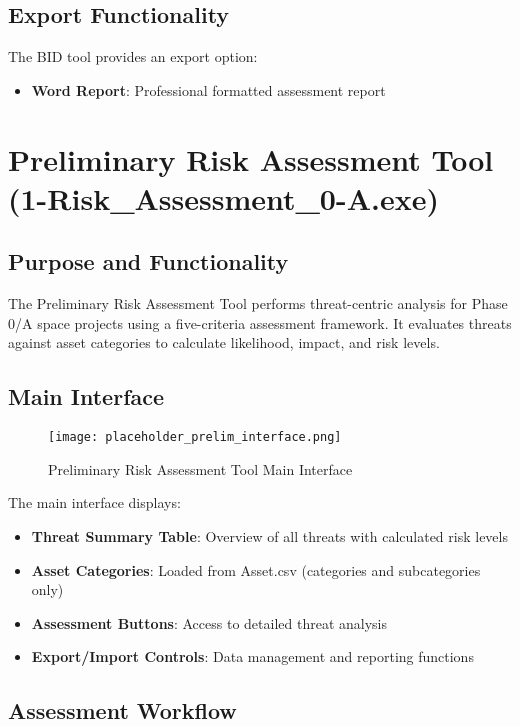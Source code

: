 \documentclass[binding=0.6cm]{sapthesis}
\begin{document}
\subsection{Export Functionality}

The BID tool provides an export option:
\begin{itemize}
    \item \textbf{Word Report}: Professional formatted assessment report
\end{itemize}

\section{Preliminary Risk Assessment Tool (1-Risk\_Assessment\_0-A.exe)}

\subsection{Purpose and Functionality}

The Preliminary Risk Assessment Tool performs threat-centric analysis for Phase 0/A space projects using a five-criteria assessment framework. It evaluates threats against asset categories to calculate likelihood, impact, and risk levels.

\subsection{Main Interface}

\begin{figure}[H]
    \centering
    \texttt{[image: placeholder\_prelim\_interface.png]}
    \caption{Preliminary Risk Assessment Tool Main Interface}
    \label{fig:prelim_interface}
\end{figure}

The main interface displays:
\begin{itemize}
    \item \textbf{Threat Summary Table}: Overview of all threats with calculated risk levels
    \item \textbf{Asset Categories}: Loaded from Asset.csv (categories and subcategories only)
    \item \textbf{Assessment Buttons}: Access to detailed threat analysis
    \item \textbf{Export/Import Controls}: Data management and reporting functions
\end{itemize}

\subsection{Assessment Workflow}
\end{document}
